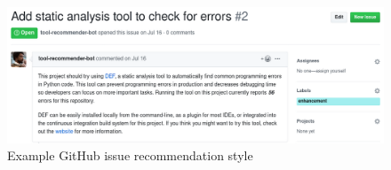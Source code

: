 \begin{figure}[H]
\centering
	\includegraphics[width=\textwidth]{Appendix-C/images/issue-rec.png}
	\caption{Example GitHub issue recommendation style}	
	\label{fig:issue-rec} 
\end{figure}
